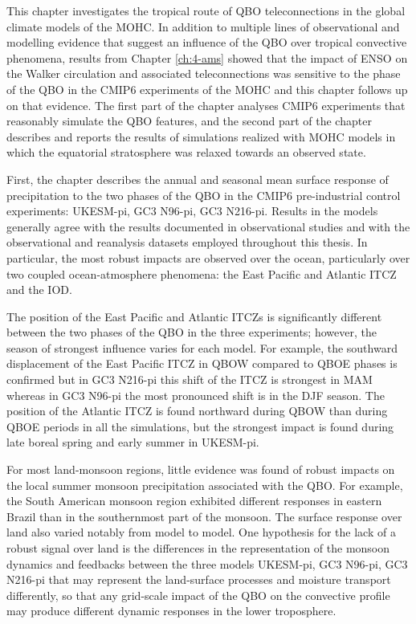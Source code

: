 This chapter investigates the tropical route of QBO teleconnections in the global climate models of the MOHC.
In addition to multiple lines of observational and modelling evidence that suggest an influence of the QBO over tropical convective phenomena, results from Chapter \ref{ch:4-ams} showed that the impact of ENSO on the Walker circulation and associated teleconnections was sensitive to the phase of the QBO in the CMIP6 experiments of the MOHC and this chapter follows up on that evidence. 
The first part of the chapter analyses CMIP6 experiments that reasonably simulate the QBO features, and the second part of the chapter describes and reports the results of simulations realized with MOHC models in which the equatorial stratosphere was relaxed towards an observed state.

 First, the chapter describes the annual and seasonal mean surface response of precipitation to the two phases of the QBO in the CMIP6 pre-industrial control experiments: UKESM-pi, GC3 N96-pi, GC3 N216-pi.  
Results in the models generally agree with the results documented in observational studies \citep{liess2012,gray2018} and with the observational and reanalysis datasets employed throughout this thesis. In particular, the most robust impacts are observed over the ocean, particularly over two coupled ocean-atmosphere phenomena: the East Pacific and Atlantic ITCZ and the IOD. 

The position of the East Pacific and Atlantic ITCZs is significantly different between the two phases of the QBO in the three experiments; however, the season of strongest influence varies for each model. 
For example, the southward displacement of the East Pacific ITCZ in QBOW compared to QBOE phases  \citep[as previously reported, e.g., by][]{gray2018} is confirmed but in GC3 N216-pi this shift of the ITCZ is strongest in MAM whereas in GC3 N96-pi the most pronounced shift is in the DJF season. 
The position of the Atlantic ITCZ is found northward during QBOW than during QBOE periods in all the simulations, but the strongest impact is found during late boreal spring and early summer in UKESM-pi. 

For most land-monsoon regions, little evidence was found of robust impacts on the local summer monsoon precipitation associated with the QBO. For example,  the South American monsoon region exhibited different responses in eastern Brazil than in the southernmost part of the monsoon. The surface response over land also varied notably from model to model.
One hypothesis for the lack of a robust signal over land is the differences in the representation of the monsoon dynamics and feedbacks between the three models UKESM-pi, GC3 N96-pi, GC3 N216-pi that may represent the land-surface processes and moisture transport differently, so that any grid-scale impact of the QBO on the convective profile may produce different dynamic responses in the lower troposphere. 

